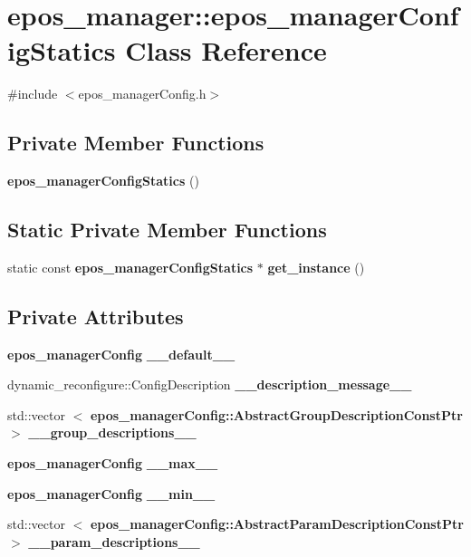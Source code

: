 \section{epos\-\_\-manager\-:\-:epos\-\_\-manager\-Config\-Statics \-Class \-Reference}
\label{classepos__manager_1_1epos__managerConfigStatics}


{\ttfamily \#include $<$epos\-\_\-manager\-Config.\-h$>$}

\subsection*{\-Private \-Member \-Functions}
\begin{DoxyCompactItemize}
\item 
{\bf epos\-\_\-manager\-Config\-Statics} ()
\end{DoxyCompactItemize}
\subsection*{\-Static \-Private \-Member \-Functions}
\begin{DoxyCompactItemize}
\item 
static const \*
{\bf epos\-\_\-manager\-Config\-Statics} $\ast$ {\bf get\-\_\-instance} ()
\end{DoxyCompactItemize}
\subsection*{\-Private \-Attributes}
\begin{DoxyCompactItemize}
\item 
{\bf epos\-\_\-manager\-Config} {\bf \-\_\-\-\_\-default\-\_\-\-\_\-}
\item 
dynamic\-\_\-reconfigure\-::\-Config\-Description {\bf \-\_\-\-\_\-description\-\_\-message\-\_\-\-\_\-}
\item 
std\-::vector\*
$<$ {\bf epos\-\_\-manager\-Config\-::\-Abstract\-Group\-Description\-Const\-Ptr} $>$ {\bf \-\_\-\-\_\-group\-\_\-descriptions\-\_\-\-\_\-}
\item 
{\bf epos\-\_\-manager\-Config} {\bf \-\_\-\-\_\-max\-\_\-\-\_\-}
\item 
{\bf epos\-\_\-manager\-Config} {\bf \-\_\-\-\_\-min\-\_\-\-\_\-}
\item 
std\-::vector\*
$<$ {\bf epos\-\_\-manager\-Config\-::\-Abstract\-Param\-Description\-Const\-Ptr} $>$ {\bf \-\_\-\-\_\-param\-\_\-descriptions\-\_\-\-\_\-}
\end{DoxyCompactItemize}
